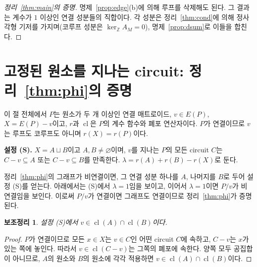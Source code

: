 \documentclass[11pt,a4paper]{article}
\theoremstyle{plain}
\newtheorem{lemma}[theorem]{보조정리}
\theoremstyle{definition}
\newcommand{\Z}{\mathbb Z}
\newcommand{\kerZ}{\ker_{\Z}\!A_M}
\newcommand{\cl}{\operatorname{cl}}
\begin{document}
\begin{proof}[정리~\ref{thm:main}의 증명]
명제~\ref{prop:edge}(b)에 의해 루프를 삭제해도 된다. 그 결과는 계수가 $1$ 이상인 연결 성분들의 직합이다. 각 성분은 정리~\ref{thm:cond}에 의해 정사각형 기저를 가지며(코루프 성분은 $\kerZ=0$), 명제~\ref{prop:dsum}로 이들을 합친다.
\end{proof}

\section{고정된 원소를 지나는 circuit: 정리~\ref{thm:phi}의 증명}\label{sec:phiproof}
이 절 전체에서 $P$는 원소가 두 개 이상인 연결 매트로이드, $v\in E(P)$, $X=E(P)-v$이고, $r$과 $\cl$은 $P$의 계수 함수와 폐포 연산자이다. $P$가 연결이므로 $v$는 루프도 코루프도 아니며 $r(X)=r(P)$이다.

\medskip\noindent\textbf{설정 (S).} $X=A\sqcup B$이고 $A,B\ne\varnothing$이며, $v$를 지나는 $P$의 모든 circuit $C$는 $C-v\subseteq A$ 또는 $C-v\subseteq B$를 만족한다. $\lambda=r(A)+r(B)-r(X)$로 둔다.

정리~\ref{thm:phi}의 그래프가 비연결이면, 그 연결 성분 하나를 $A$, 나머지를 $B$로 두어 설정 (S)를 얻는다. 아래에서는 (S)에서 $\lambda=1$임을 보이고, 이어서 $\lambda=1$이면 $P/v$가 비연결임을 보인다. 이로써 $P/v$가 연결이면 그래프도 연결이므로 정리~\ref{thm:phi}가 증명된다.

\begin{lemma}\label{lem:phi1}
설정 (S)에서 $v\in\cl(A)\cap\cl(B)$이다.
\end{lemma}
\begin{proof}
$P$가 연결이므로 모든 $x\in X$는 $v\in C$인 어떤 circuit $C$에 속하고, $C-v$는 $x$가 있는 쪽에 놓인다. 따라서 $v\in\cl(C-v)$는 그쪽의 폐포에 속한다. 양쪽 모두 공집합이 아니므로, $A$의 원소와 $B$의 원소에 각각 적용하면 $v\in\cl(A)\cap\cl(B)$이다.
\end{proof}
\end{document}
